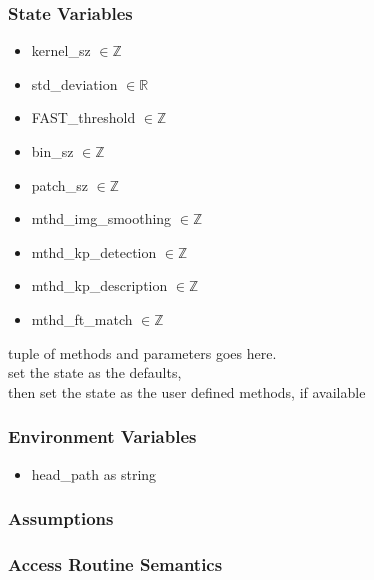 \documentclass[12pt, titlepage]{article}
\begin{document}
\subsubsection{State Variables}
\begin{itemize}
  \item kernel\_sz $ \in \mathbb{Z}$
  \item std\_deviation $ \in \mathbb{R}$
  \item FAST\_threshold $ \in \mathbb{Z}$
  \item bin\_sz $ \in \mathbb{Z}$
  \item patch\_sz $ \in \mathbb{Z}$
  \item mthd\_img\_smoothing $ \in \mathbb{Z}$
  \item mthd\_kp\_detection $ \in \mathbb{Z}$
  \item mthd\_kp\_description $ \in \mathbb{Z}$
  \item mthd\_ft\_match $ \in \mathbb{Z}$
\end{itemize}

tuple of methods and parameters goes here.\\
set the state as the defaults, \\
then set the state as the user defined methods, if available






\subsubsection{Environment Variables}
\begin{itemize}
  \item head\_path as string
\end{itemize}

\subsubsection{Assumptions}


\subsubsection{Access Routine Semantics}
\end{document}
